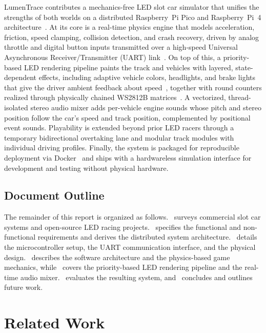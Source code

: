 \documentclass[10pt,journal,final,a4paper]{IEEEtran}
\begin{document}
LumenTrace contributes a mechanics-free LED slot car simulator that unifies the strengths of both worlds on a distributed Raspberry~Pi Pico and Raspberry~Pi~4 architecture~\cite{magpi:2024raspberry}. 
At its core is a real-time physics engine that models acceleration, friction, speed clamping, collision detection, and crash recovery, driven by analog throttle and digital button inputs transmitted over a high-speed Universal Asynchronous Receiver/Transmitter (UART) link~\cite{pena:2020uart}. On top of this, a priority-based LED rendering pipeline paints the track and vehicles with layered, state-dependent effects, including adaptive vehicle colors, headlights, and brake lights that give the driver ambient feedback about speed~\cite{meschtscherjakov:2015chaselight}, together with round counters realized through physically chained WS2812B matrices~\cite{garff:2023rpi}. 
A vectorized, thread-isolated stereo audio mixer adds per-vehicle engine sounds whose pitch and stereo position follow the car's speed and track position, complemented by positional event sounds. Playability is extended beyond prior LED racers through a temporary bidirectional overtaking lane and modular track modules with individual driving profiles. Finally, the system is packaged for reproducible deployment via Docker~\cite{merkel:2014docker} and ships with a hardwareless simulation interface for development and testing without physical hardware. 

\subsection{Document Outline}
\label{subsec:document-outline}

The remainder of this report is organized as follows.~ surveys commercial slot car systems and open-source LED racing projects.~ specifies the functional and non-functional requirements and derives the distributed system architecture.~ details the microcontroller setup, the UART communication interface, and the physical design.~ describes the software architecture and the physics-based game mechanics, while~ covers the priority-based LED rendering pipeline and the real-time audio mixer.~ evaluates the resulting system, and~ concludes and outlines future work.

\section{Related Work}
\label{sec:related-work}
\end{document}
